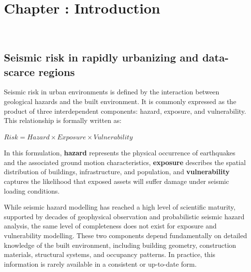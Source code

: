 \graphicspath{{figures_and_references/EELISA_conference/}}

\renewcommand{\chapternametext}{Chapter \thechapter: Introduction}

\chapter{\chapternametext}
\

\renewcommand{\headingtextL}{}
\renewcommand{\headingtextR}{\chapternametext}
\begingroup
 \flushbottom
 \setlength{\parskip}{0pt plus 1fil}%
 \localtableofcontents 
\endgroup

\begingroup
 \flushbottom
 \setlength{\parskip}{0pt plus 1fil}%
 \locallistoffigures
\endgroup


\newpage

\setcounter{section}{0} 



\FloatBarrier

\renewcommand{\sectionnametext}{Seismic risk in rapidly urbanizing and data-scarce regions}
\renewcommand{\headingtextL}{\chapternametext}
\renewcommand{\headingtextR}{\thesection. \sectionnametext}
\section{\sectionnametext}


Seismic risk in urban environments is defined by the interaction between geological hazards and the built environment. It is commonly expressed as the product of three interdependent components: hazard, exposure, and vulnerability. This relationship is formally written as:

\begin{center}
    \begin{math}
        Risk = Hazard \times Exposure \times Vulnerability
    \end{math}
\end{center}

In this formulation, \textbf{hazard} represents the physical occurrence of earthquakes and the associated ground motion characteristics, \textbf{exposure} describes the spatial distribution of buildings, infrastructure, and population, and \textbf{vulnerability} captures the likelihood that exposed assets will suffer damage under seismic loading conditions.

While seismic hazard modelling has reached a high level of scientific maturity, supported by decades of geophysical observation and probabilistic seismic hazard analysis, the same level of completeness does not exist for exposure and vulnerability modelling. These two components depend fundamentally on detailed knowledge of the built environment, including building geometry, construction materials, structural systems, and occupancy patterns. In practice, this information is rarely available in a consistent or up-to-date form.

